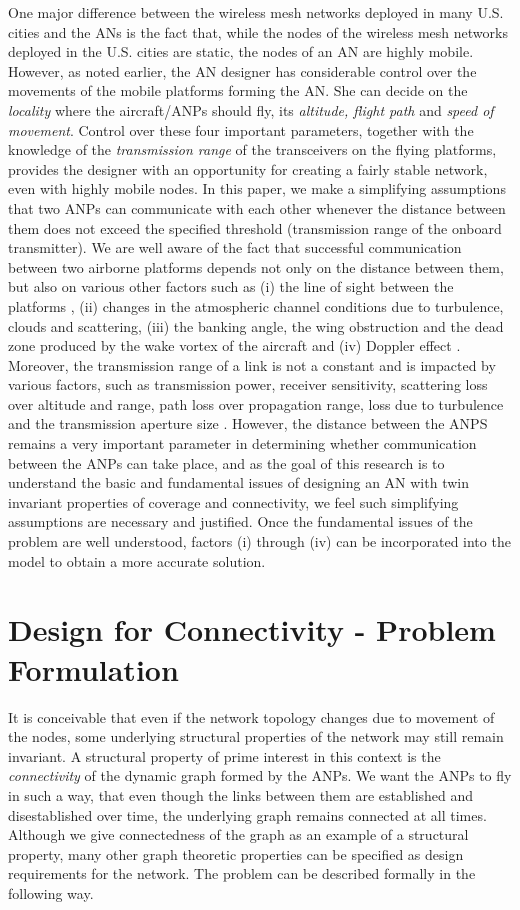 \documentclass[10pt]{IEEEtran}
\begin{document}
One major difference between the wireless mesh networks deployed in many U.S. cities \cite{Wifi08} and the ANs is the fact that, while the nodes of the wireless mesh networks deployed in the U.S.
cities are static, the nodes of an AN are highly mobile. However, as noted earlier, the AN designer has considerable control over the movements of the mobile platforms forming the AN. She can decide on the {\em locality} where the aircraft/ANPs should fly, its {\em altitude, flight path} and {\em speed of movement}. Control over these four important parameters, together with the knowledge of the {\em transmission range} of the transceivers on the flying platforms, provides the designer with an opportunity for creating a fairly stable network, even with highly mobile nodes. In this paper, we make a simplifying assumptions that two ANPs can communicate with each other whenever the distance between them does not exceed the specified threshold (transmission range of the onboard transmitter).  We are well aware of the fact that successful communication between two airborne platforms depends not only on the distance between them, but also on various other factors such as (i) the line of sight between the platforms \cite{TIW08}, (ii) changes in the atmospheric channel conditions due to turbulence, clouds and scattering, (iii) the  banking angle,  the wing obstruction and the dead zone  produced by the wake vortex of the aircraft \cite{EPS04} and (iv) Doppler effect \cite{Doppler} . Moreover, the transmission range of a link is not a constant and is impacted by various factors, such as transmission power, receiver sensitivity, scattering loss over altitude and range, path loss over propagation range, loss due to turbulence and the transmission aperture size \cite{EPS04}. However, the distance between the ANPS remains a very important parameter in determining whether communication between the ANPs can take place, and as the goal of this research is to understand the basic and fundamental issues of designing an AN with twin invariant properties of coverage and connectivity, we feel such simplifying assumptions are necessary and justified. Once the fundamental issues of the problem are well understood, factors (i) through (iv) can be incorporated into the model to obtain a more accurate solution.

\section{Design for Connectivity - Problem Formulation}
\label{sec:probFormulation}
It is conceivable that even if the network topology changes due to movement of the nodes, some underlying structural properties of the network may still remain invariant.
A structural property of prime interest in this context is the {\em connectivity} of the dynamic graph formed by the ANPs. We want the ANPs to fly in such a way, that even though the links between them are established and disestablished over time, the underlying graph remains connected at all times. Although we give connectedness of the graph as an example of a structural property, many other graph theoretic properties  can be specified as design requirements for the network. The problem can be described formally in the following way.
\end{document}
